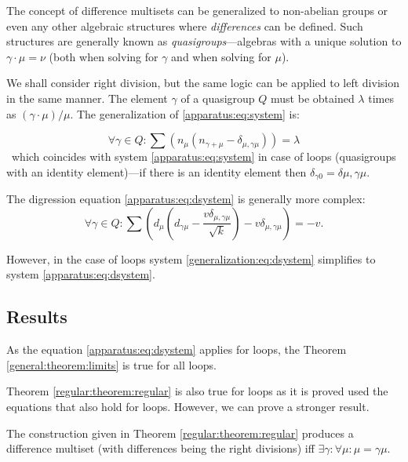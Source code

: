 The concept of difference multisets can be generalized to non-abelian groups or even any other algebraic structures where \emph{differences} can be defined. Such structures are generally known as \emph{quasigroups}---algebras with a unique solution to $\gamma\cdot\mu=\nu$ (both when solving for $\gamma$ and when solving for $\mu$).

We shall consider right division, but the same logic can be applied to left division in the same manner. The element $\gamma$ of a quasigroup $Q$ must be obtained $\lambda$ times as $(\gamma\cdot\mu)/\mu$. The generalization of \eqref{apparatus:eq:system} is:

    \begin{equation}
        \label{generalization:eq:system}
        \forall \gamma \in Q \colon \sum (n_\mu(n_{\gamma+\mu}-\delta_{\mu,\gamma\mu})) = \lambda
    \end{equation}\
which coincides with system \eqref{apparatus:eq:system} in case of loops (quasigroups with an identity element)---if there is an identity element then $\delta_{\gamma0}=\delta{\mu,\gamma\mu}$.

The digression equation \eqref{apparatus:eq:dsystem} is generally more complex:
    \begin{equation}
        \label{generalization:eq:dsystem}
        \forall \gamma \in Q \colon \sum (d_\mu (d_{\gamma\mu}-\frac{v\delta_{\mu,\gamma\mu}}{\sqrt k})-v\delta_{\mu,\gamma\mu}) = -v.
    \end{equation}

However, in the case of loops system \eqref{generalization:eq:dsystem} simplifies to system \eqref{apparatus:eq:dsystem}.

\subsection{Results}

As the equation \eqref{apparatus:eq:dsystem} applies for loops, the Theorem \ref{general:theorem:limits} is true for all loops.

Theorem \ref{regular:theorem:regular} is also true for loops as it is proved used the equations that also hold for loops. However, we can prove a stronger result.

\begin{theorem}
        \label{generalization:theorem:regular}
        The construction given in Theorem \ref{regular:theorem:regular} produces a difference multiset (with differences being the right divisions) iff $\exists \gamma \colon \forall \mu \colon \mu=\gamma\mu$.
    \end{theorem}
    
